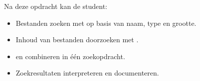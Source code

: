 Na deze opdracht kan de student:

\begin{itemize}
\item Bestanden zoeken met  op basis van naam, type en grootte.  
\item Inhoud van bestanden doorzoeken met .  
\item {} en  combineren in \'e\'en zoekopdracht.  
\item Zoekresultaten interpreteren en documenteren.
\end{itemize}

